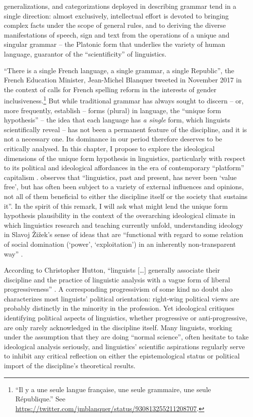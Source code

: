 \documentclass[output=paper]{langscibook}
\begin{document}
generalizations, and categorizations deployed in describing grammar tend in a single direction: almost exclusively, intellectual effort is devoted to bringing complex facts under the scope of general rules, and to deriving the diverse manifestations of speech, sign and text from the operations of a unique and singular grammar -- the Platonic form that underlies the variety of human language, guarantor of the ``scientificity'' of linguistics.

``There is a single French language, a single grammar, a single Republic'', the French Education Minister, Jean-Michel Blanquer tweeted in November 2017 in the context of calls for French spelling reform in the interests of gender inclusiveness.\footnote{``Il y a une seule langue française, une seule grammaire, une seule République.'' See \url{https://twitter.com/jmblanquer/status/930813255211208707}.} But while traditional grammar has always sought to discern -- or, more frequently, establish -- forms (plural) in language, the ``unique form hypothesis'' -- the idea that each language has \emph{a single} form, which linguists scientifically reveal -- has not been a permanent feature of the discipline, and it is not a necessary one. Its dominance in our period therefore deserves to be critically analysed. In this chapter, I propose to explore the ideological dimensions of the unique form hypothesis in linguistics, particularly with respect to its political and ideological affordances in the era of contemporary ``platform'' capitalism \citep{Srnicek2017}. \citet[19]{Koerner2000} observes that ``linguistics, past and present, has never been `value free', but has often been subject to a variety of external influences and opinions, not all of them beneficial to either the discipline itself or the society that sustains it''. In the spirit of this remark, I will ask what might lend the unique form hypothesis plausibility in the context of the overarching ideological climate in which linguistics research and teaching currently unfold, understanding ideology in Slavoj Žižek's sense of ideas that are ``functional with regard to some relation of social domination (`power', `exploitation') in an inherently non-transparent way'' \citep[8]{Zizek1994}.

According to Christopher Hutton, ``linguists […] generally associate their discipline and the practice of linguistic analysis with a vague form of liberal progressiveness'' \citep[295]{Hutton2001}. A corresponding progressivism of some kind no doubt also characterizes most linguists' political orientation: right-wing political views are probably distinctly in the minority in the profession. Yet ideological critiques identifying political aspects of linguistics, whether progressive or anti-progressive, are only rarely acknowledged in the discipline itself. Many linguists, working under the assumption that they are doing ``normal science'', often hesitate to take ideological analysis seriously, and linguistics' scientific aspirations regularly serve to inhibit any critical reflection on either the epistemological status or political import of the discipline's theoretical results.
\end{document}
